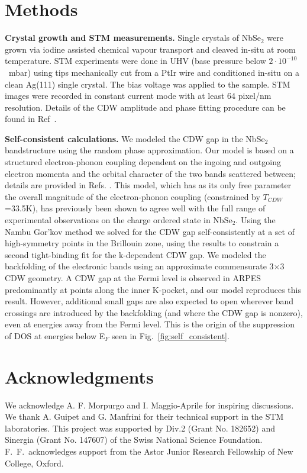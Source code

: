 \documentclass[aps,prl,twocolumn,superscriptaddress]{revtex4-2}
\begin{document}
\section{Methods}

\textbf{Crystal growth and STM measurements.} Single crystals of NbSe$_2$ were grown via iodine assisted chemical vapour transport and cleaved in-situ at room temperature. STM experiments were done in UHV (base pressure below $2\cdot10^{-10}$~mbar) using tips mechanically cut from a PtIr wire and conditioned in-situ on a clean Ag(111) single crystal. The bias voltage was applied to the sample. STM images were recorded in constant current mode with at least 64 pixel/nm resolution. Details of the CDW amplitude and phase fitting procedure can be found in Ref~\cite{Pasztor2019}. 

\bigskip

\textbf{Self-consistent calculations.} We modeled the CDW gap in the NbSe$_2$ bandstructure using the random phase approximation. Our model is based on a structured electron-phonon coupling dependent on the ingoing and outgoing electron momenta and the orbital character of the two bands scattered between; details are provided in Refs. \cite{Flicker2015natcomm, Flicker2016prb}. This model, which has as its only free parameter the overall magnitude of the electron-phonon coupling (constrained by $T_{CDW}$=33.5K), has previously been shown to agree well with the full range of experimental observations on the charge ordered state in NbSe$_2$. Using the Nambu Gor'kov method we solved for the CDW gap self-consistently at a set of high-symmetry points in the Brillouin zone, using the results to constrain a second tight-binding fit for the k-dependent CDW gap. We modeled the backfolding of the electronic bands using an approximate commensurate 3$\times$3 CDW geometry. A CDW gap at the Fermi level is observed in ARPES predominantly at points along the inner K-pocket, and our model reproduces this result. However, additional small gaps are also expected to open wherever band crossings are introduced by the backfolding (and where the CDW gap is nonzero), even at energies away from the Fermi level. This is the origin of the suppression of DOS at energies below E$_F$ seen in Fig.~\ref{fig:self_consistent}.

\section{Acknowledgments}
We acknowledge A. F. Morpurgo and I. Maggio-Aprile for inspiring discussions. We thank A. Guipet and G. Manfrini for their technical support in the STM laboratories. This project was supported by Div.2 (Grant No. 182652) and Sinergia (Grant No. 147607) of the Swiss National Science Foundation. F.~F.~acknowledges support from the Astor Junior Research Fellowship of New College, Oxford.  
\end{document}
